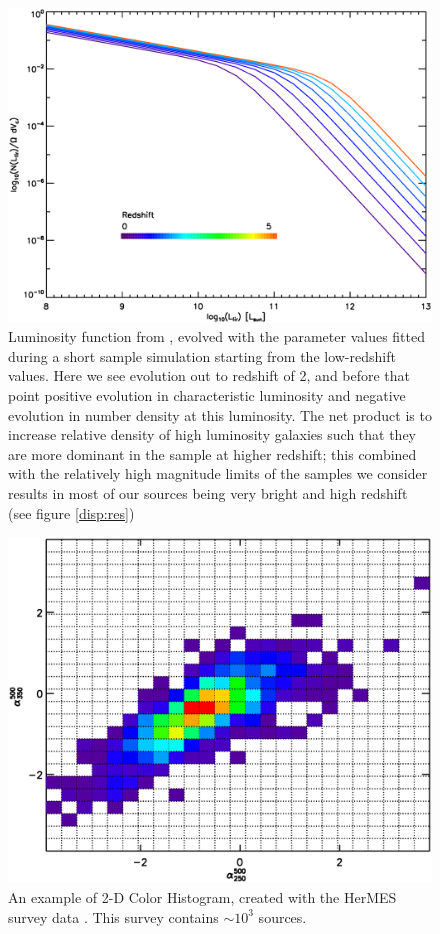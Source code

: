 \documentclass[twocolumn,letterpaper,10pt]{article}
\begin{document}
\begin{figure}
\centering
\includegraphics[width=\textwidth]{sim_lumfunct.eps}
\caption{Luminosity function from \citet{negrello13}, evolved with the parameter values fitted during a short sample simulation starting from the low-redshift \citet{Caputi07} values. Here we see evolution out to redshift of 2, and before that point positive evolution in characteristic luminosity and negative evolution in number density at this luminosity. The net product is to increase relative density of high luminosity galaxies such that they are more dominant in the sample at higher redshift; this combined with the relatively high magnitude limits of the samples we consider results in most of our sources being very bright and high redshift (see figure \ref{disp:res})}
\label{lf}
\end{figure}

\begin{figure}
  \includegraphics[width=\textwidth]{obs_color_hist.eps}
  \caption{An example of 2-D Color Histogram, created with the HerMES survey data \citep{HerMES}. This survey contains $\sim 10^3$ sources.}
  \label{fig:hist1}
\end{figure}
\end{document}
